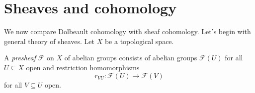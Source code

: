 \documentclass[a4paper]{article}
\begin{document}
\section{Sheaves and cohomology}

We now compare Dolbeault cohomology with sheaf cohomology. Let's begin with general theory of sheaves. Let \(X\) be a topological space.

\begin{definition}
  A \emph{presheaf} \(\mathcal F\) on \(X\) of abelian groups consists of abelian groups \(\mathcal F(U)\) for all \(U \subseteq X\) open and restriction homomorphisms
  \[
    r_{VU}: \mathcal F(U) \to \mathcal F(V)
  \]
  for all \(V \subseteq U\) open.
\end{definition}










\printindex
\end{document}
